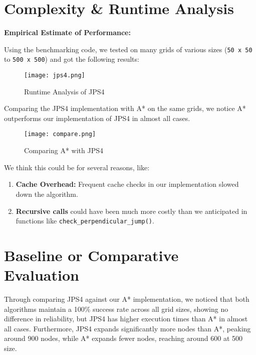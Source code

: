 \documentclass[11pt]{article}
\begin{document}
\section{Complexity \& Runtime Analysis}

\textbf{Empirical Estimate of Performance:}

Using the benchmarking code, we tested on many grids of various sizes (\texttt{50 x 50} to \texttt{500 x 500}) and got the following results:

\begin{figure}[h!]
    \centering
    \texttt{[image: jps4.png]}
    \caption{Runtime Analysis of JPS4}
    \label{fig:jps4-runtime}
\end{figure}

\FloatBarrier

Comparing the JPS4 implementation with A* on the same grids, we notice A* outperforms our implementation of JPS4 in almost all cases.

\begin{figure}[h!]
    \centering
    \texttt{[image: compare.png]}
    \caption{Comparing A* with JPS4}
    \label{fig:enter-label}
\end{figure}

\FloatBarrier

We think this could be for several reasons, like:

\begin{enumerate}
    \item \textbf{Cache Overhead:} Frequent cache checks in our implementation slowed down the algorithm.
    \item \textbf{Recursive calls} could have been much more costly than we anticipated in functions like \texttt{check\_perpendicular\_jump()}.
\end{enumerate}

\section{Baseline or Comparative Evaluation}

Through comparing JPS4 against our A* implementation, we noticed that both algorithms maintain a 100\% success rate across all grid sizes, showing no difference in reliability, but JPS4 has higher execution times than A* in almost all cases. Furthermore, JPS4 expands significantly more nodes than A*, peaking around 900 nodes, while A* expands fewer nodes, reaching around 600 at 500 size.
\end{document}
